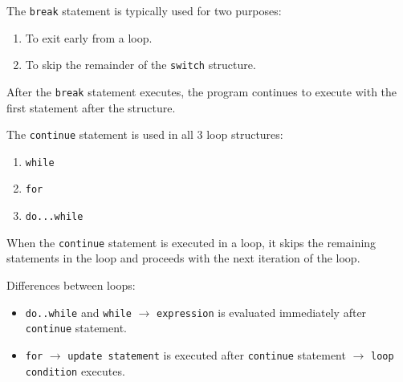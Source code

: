 \documentclass{article}
\begin{document}
\vspace{8pt}
The \texttt{break} statement is typically used for two purposes:
\begin{enumerate}
  \item To exit early from a loop.
  \item To skip the remainder of the \texttt{switch} structure.
\end{enumerate}

After the \texttt{break} statement executes, the program continues to execute
with the first statement after the structure.

\vspace{8pt}
The \texttt{continue} statement is used in all 3 loop structures:
\begin{enumerate}
  \item \texttt{while}
  \item \texttt{for}
  \item \texttt{do...while}
\end{enumerate}

When the \texttt{continue} statement is executed in a loop, it skips the
remaining statements in the loop and proceeds with the next iteration of the loop. 

\vspace{8pt}
Differences between loops:
\begin{itemize}
  \item \texttt{do..while} and \texttt{while} $\rightarrow$ \texttt{expression}
    is evaluated immediately after \allowbreak \texttt{continue} statement.
  \item \texttt{for} $\rightarrow$ \texttt{update statement} is executed after
    \texttt{continue} statement $\rightarrow$ \texttt{loop condition} executes.
\end{itemize}
\end{document}
